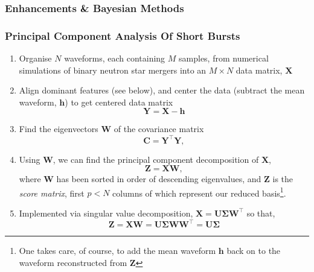 \documentclass[serif,mathserif,10pt]{beamer}
\let\oldframetitle\frametitle%
\renewcommand{\frametitle}[1]{%
      \oldframetitle{#1}\setstretch{1.2}}
\newcommand{\matr}[1]{\mathbf{#1}}
\newcommand{\tran}[1]{#1^{\top}}
\begin{document}
\begin{frame}
    \frametitle{Enhancements \& Bayesian Methods}
\end{frame}

\begin{frame}
    \frametitle{Principal Component Analysis Of Short Bursts}

    \begin{small}
    \begin{enumerate}
        \item Organise $N$ waveforms, each containing $M$ samples, from
            numerical simulations of binary neutron star mergers into an $M\times N$
            data matrix, $\matr{X}$
        \item Align dominant features (see below), and center the data (subtract the
            mean waveform, $\matr{h}$) to get centered data matrix
            \begin{equation}
            \matr{Y}=\matr{X}-\matr{h}
        \end{equation}
        \item Find the eigenvectors $\matr{W}$ of the covariance matrix
            \begin{equation}
            \matr{C} = \tran{\matr{Y}}\matr{Y},
        \end{equation}
    \item Using $\matr{W}$, we can find the principal component
            decomposition of $\matr{X}$,
            \begin{equation}\label{eq:pca}
                \matr{Z} = \matr{X} \matr{W},
            \end{equation}
            where $\matr{W}$ has been sorted in order of descending eigenvalues, and
            $\matr{Z}$ is the \emph{score matrix}, first $p<N$ columns of
            which represent our reduced basis\footnote{One takes care, of course, to
            add the mean waveform $\matr{h}$ back on to the waveform reconstructed
        from $\matr{Z}$}.
        \item Implemented via singular value decomposition, $\matr{X} =
            \matr{U}\matr{\Sigma}\tran{\matr{W}}$ so that,
            \begin{equation}
                \matr{Z} = \matr{X} \matr{W} =
                \matr{U}\matr{\Sigma}\matr{W}\tran{\matr{W}} = \matr{U}\matr{\Sigma}
            \end{equation}
    \end{enumerate}
\end{small}
\end{frame}
\end{document}

